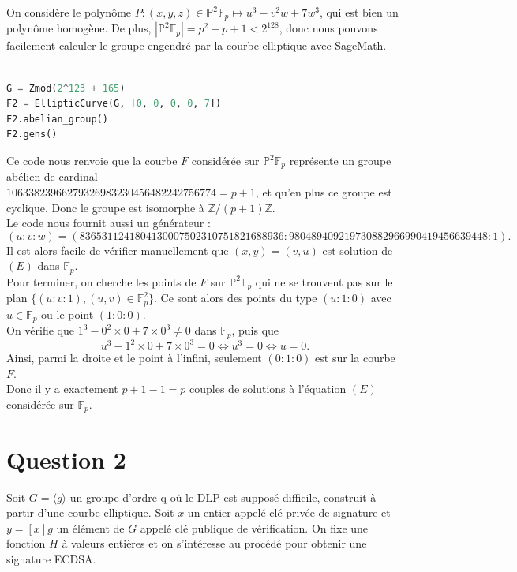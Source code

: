 \documentclass{article}
\newcommand{\bZ}{\mathbb{Z}}
\newcommand{\bP}{\mathbb{P}}
\newcommand{\bF}{\mathbb{F}}
\begin{document}
On considère le polynôme $P:(x,y,z)\in \mathbb{P}^2\bF_p \longmapsto u^3 - v^2w + 7w^3$, qui est bien un polynôme homogène. De plus, $|\mathbb{P}^2\bF_p| = p^2+p+1 < 2^{128}$, donc nous pouvons facilement calculer le groupe engendré par la courbe elliptique avec SageMath.

\begin{lstlisting}[language = Python]

G = Zmod(2^123 + 165)
F2 = EllipticCurve(G, [0, 0, 0, 0, 7])
F2.abelian_group()
F2.gens()

\end{lstlisting}

Ce code nous renvoie que la courbe $F$ considérée sur $\bP^2\bF_p$ représente un groupe abélien de cardinal\\$10633823966279326983230456482242756774 = p+1$, et qu'en plus ce groupe est cyclique. Donc le groupe est isomorphe à $\bZ/(p+1)\bZ$.\\
Le code nous fournit aussi un générateur : $$(u : v : w) = (8365311241804130007502310751821688936 : 980489409219730882966990419456639448 : 1).$$
Il est alors facile de vérifier manuellement que $(x,y) = (v,u)$ est solution de $(E)$ dans $\bF_p$.\\

Pour terminer, on cherche les points de $F$ sur $\bP^2\bF_p$ qui ne se trouvent pas sur le plan $\{(u : v : 1), (u,v)\in \bF_p^2\}$. Ce sont alors des points du type $(u : 1 : 0)$ avec $u\in \bF_p$ ou le point $(1 : 0 : 0)$.\\
On vérifie que $1^3 - 0^2\times 0 + 7\times 0^3 \neq 0$ dans $\bF_p$, puis que \[u^3 - 1^2\times 0 + 7\times 0^3 = 0 \Longleftrightarrow u^3 = 0 \Longleftrightarrow u = 0.\]
Ainsi, parmi la droite et le point à l'infini, seulement $(0 : 1 : 0)$ est sur la courbe $F$.\\
Donc il y a exactement $p+1-1 = p$ couples de solutions à l'équation $(E)$ considérée sur $\bF_p$.

\newpage





\section{Question 2}

Soit $G = \langle g\rangle$ un groupe d’ordre q où le DLP est supposé difficile, construit à partir d’une
courbe elliptique. Soit $x$ un entier appelé clé privée de signature et $y = [x]g$ un élément de
$G$ appelé clé publique de vérification. On fixe une fonction $H$ à valeurs entières et on s'intéresse au procédé pour obtenir une signature ECDSA.
\end{document}
